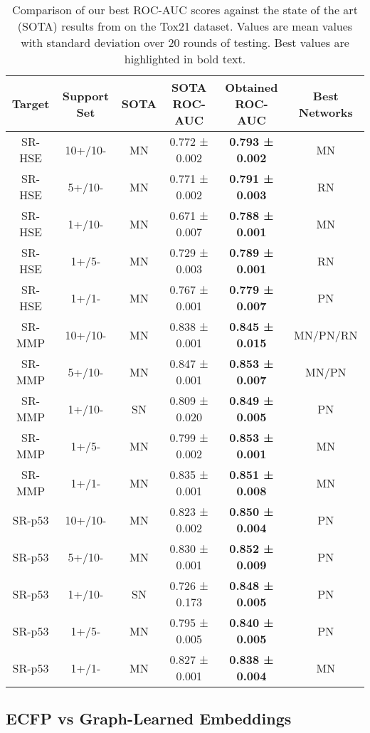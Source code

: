 \begin{table}[ht]
	\centering
	\begin{tabular}{@{}cccccc@{}}
	\hline
	\textbf{Target} & \textbf{Support Set} & \textbf{SOTA} & \textbf{SOTA ROC-AUC} & \textbf{Obtained ROC-AUC} & \textbf{Best Networks} \\
	\hline	
	SR-HSE & 10+/10- & MN & 0.772 ± 0.002 & \textbf{0.793 ± 0.002} & MN \\
	SR-HSE & 5+/10- & MN & 0.771 ± 0.002 & \textbf{0.791 ± 0.003} & RN \\
	SR-HSE & 1+/10- & MN & 0.671 ± 0.007 & \textbf{0.788 ± 0.001} & MN \\
	SR-HSE & 1+/5- & MN & 0.729 ± 0.003 & \textbf{0.789 ± 0.001} & RN \\
	SR-HSE & 1+/1- & MN & 0.767 ± 0.001 & \textbf{0.779 ± 0.007} & PN \\
	SR-MMP & 10+/10- & MN & 0.838 ± 0.001 & \textbf{0.845 ± 0.015} & MN/PN/RN \\
	SR-MMP & 5+/10- & MN & 0.847 ± 0.001 & \textbf{0.853 ± 0.007} & MN/PN \\
	SR-MMP & 1+/10- & SN & 0.809 ± 0.020 & \textbf{0.849 ± 0.005} & PN \\
	SR-MMP & 1+/5- & MN & 0.799 ± 0.002 & \textbf{0.853 ± 0.001} & MN \\
	SR-MMP & 1+/1- & MN & 0.835 ± 0.001 & \textbf{0.851 ± 0.008} & MN \\
	SR-p53 & 10+/10- & MN & 0.823 ± 0.002 & \textbf{0.850 ± 0.004} & PN \\
	SR-p53 & 5+/10- & MN & 0.830 ± 0.001 & \textbf{0.852 ± 0.009} & PN \\
	SR-p53 & 1+/10- & SN & 0.726 ± 0.173 & \textbf{0.848 ± 0.005} & PN \\
	SR-p53 & 1+/5- & MN & 0.795 ± 0.005 & \textbf{0.840 ± 0.005} & PN \\
	SR-p53 & 1+/1- & MN & 0.827 ± 0.001 & \textbf{0.838 ± 0.004} & MN \\
	\hline	
	\end{tabular}
	\caption[Comparing our best ROC-AUC scores with the SOTA results on Tox21.]{Comparison of our best ROC-AUC scores against the state of the art (SOTA) results from \citet{altae2017low} on the Tox21 dataset. Values are mean values with standard deviation over 20 rounds of testing. Best values are highlighted in bold text.}
	\label{table:Tox21-sota-ours}
\end{table}

\subsection{ECFP vs Graph-Learned Embeddings}

